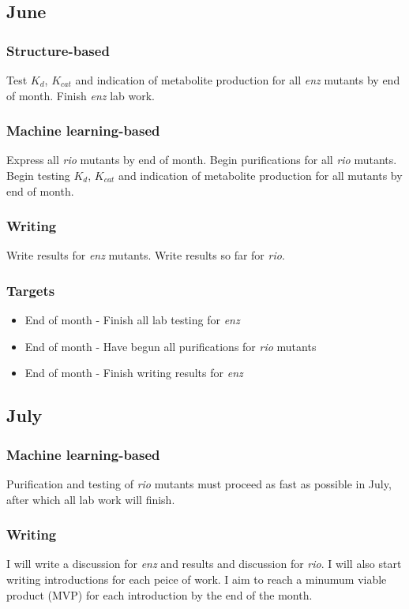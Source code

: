 \documentclass{article}
\begin{document}
\subsection{June}
\subsubsection{Structure-based}
Test $K_d$, $K_{cat}$ and indication of metabolite production for all \textit{enz} mutants by end of month. Finish \textit{enz} lab work.
\subsubsection{Machine learning-based}
Express all \textit{rio} mutants by end of month. Begin purifications for all \textit{rio} mutants. Begin testing $K_d$, $K_{cat}$ and indication of metabolite production for all mutants by end of month.
\subsubsection{Writing}
Write results for \textit{enz} mutants. Write results so far for \textit{rio}.
\subsubsection{Targets}
\begin{itemize}
\item End of month - Finish all lab testing for \textit{enz}
\item End of month - Have begun all purifications for \textit{rio} mutants
\item End of month - Finish writing results for \textit{enz}
\end{itemize}


\subsection{July}
\subsubsection{Machine learning-based}
Purification and testing of \textit{rio} mutants must proceed as fast as possible in July, after which all lab work will finish.
\subsubsection{Writing}
I will write a discussion for \textit{enz} and  results and discussion for \textit{rio}. %
I will also start writing introductions for each peice of work. I aim to reach a minumum viable product (MVP) for each introduction by the end of the month.
\end{document}
